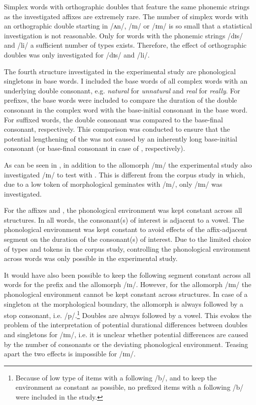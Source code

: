 Simplex words with orthographic doubles that feature the same phonemic strings as the investigated affixes are extremely rare. The number of simplex words with an orthographic double starting in /ʌn/, /ɪn/ or /ɪm/ is so small that a statistical investigation is not reasonable. Only for words with the phonemic strings /dɪs/ and /li/ a sufficient number of types exists. Therefore, the effect of orthographic doubles was only investigated for /dɪs/ and /li/. 


The fourth structure investigated in the experimental study are phonological singletons in base words. I included the base words of all complex words with an underlying double consonant, e.g. \textit{natural} for \textit{unnatural} and \textit{real} for \textit{really}. For prefixes, the base words were included to compare the duration of the double consonant in the complex word with the base-initial consonant in the base word. For suffixed words, the double consonant was compared to the base-final consonant, respectively. This comparison was conducted to ensure that the potential lengthening of the  was not caused by an inherently long base-initial consonant (or base-final consonant in case of , respectively).


As can be seen in , in addition to  the allomorph /ɪm/  the experimental study also investigated /ɪn/ to test  with  . This is different from the corpus study in which, due to a low token  of morphological {geminates} with /ɪn/, only /ɪm/ was investigated.  

For the affixes  and , the phonological environment was kept constant across all structures. In all words, the consonant(s) of interest is adjacent to a vowel. 
The phonological environment was kept constant to avoid effects of the affix-adjacent segment on the duration of the consonant(s) of interest. Due to the limited choice of types and tokens in the corpus study, controlling the phonological environment across words was only possible in the experimental study.%

It would have also been possible to keep the following segment constant across all words for the prefix  and the allomorph /ɪn/. However, for the allomorph /ɪm/ the phonological environment cannot be kept constant across structures. In case of a singleton at the morphological boundary, the allomorph is always followed  by a stop consonant, i.e. /p/.\footnote{Because of low type  of items with a following /b/, and to keep the environment as constant as possible, no  prefixed items with a following /b/ were included in the study.} Doubles are always followed by a vowel. This evokes the problem of the interpretation of potential durational differences between doubles and singletons for /ɪm/, i.e. it is unclear whether potential differences are caused by the number of consonants or the deviating phonological environment. Teasing apart the two effects is impossible for /ɪm/.

